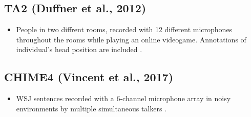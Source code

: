 \documentclass[14pt, legalpaper]{extarticle}
\begin{document}
\subsection{TA2 (Duffner et al., 2012)}

\begin{itemize}

\item People in two diffrent rooms, recorded with 12 different microphones throughout the rooms while playing an online videogame. Annotations of individual's head position are included \cite{duffner2012ta2}.

\end{itemize}

\subsection{CHIME4 (Vincent et al., 2017)}

\begin{itemize}

\item WSJ sentences recorded with a 6-channel microphone array in noisy environments by multiple simultaneous talkers \cite{vincent2017analysis}.

\end{itemize}



\end{document}
